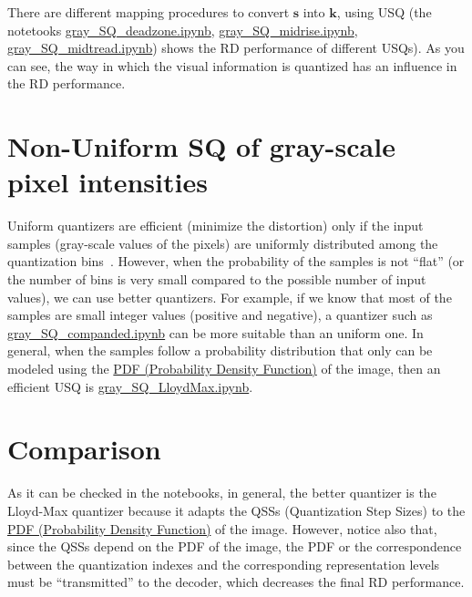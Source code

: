 There are different mapping procedures to convert $\mathbf{s}$ into
$\mathbf{k}$, using USQ (the notetooks
\href{https://github.com/Sistemas-Multimedia/Sistemas-Multimedia.github.io/blob/master/contents/gray_SQ/gray_SQ_deadzone.ipynb}{gray\_SQ\_deadzone.ipynb},
\href{https://github.com/Sistemas-Multimedia/Sistemas-Multimedia.github.io/blob/master/contents/gray_SQ/gray_SQ_midrise.ipynb}{gray\_SQ\_midrise.ipynb},
\href{https://github.com/Sistemas-Multimedia/Sistemas-Multimedia.github.io/blob/master/contents/gray_SQ/gray_SQ_midtread.ipynb}{gray\_SQ\_midtread.ipynb})
shows the RD performance of different USQs). As you can see, the way
in which the visual information is quantized has an influence in the
RD performance.

\section{Non-Uniform SQ of gray-scale pixel intensities}
Uniform quantizers are efficient (minimize the distortion) only if the
input samples (gray-scale values of the pixels) are uniformly
distributed among the quantization
bins~\cite{vruiz__scalar_quantization}. However, when the probability
of the samples is not ``flat'' (or the number of bins is very small
compared to the possible number of input values), we can use better
quantizers. For example, if we know that most of the samples are small
integer values (positive and negative), a quantizer such as
\href{https://github.com/Sistemas-Multimedia/Sistemas-Multimedia.github.io/blob/master/contents/gray_SQ/gray_SQ_companded.ipynb}{gray\_SQ\_companded.ipynb}
can be more suitable than an uniform one. In general, when the samples
follow a probability distribution that only can be modeled using the
\href{https://en.wikipedia.org/wiki/Probability_density_function}{PDF
  (Probability Density Function)} of the image, then an efficient USQ
is
\href{https://github.com/Sistemas-Multimedia/Sistemas-Multimedia.github.io/blob/master/contents/gray_SQ/gray_SQ_LloydMax.ipynb}{gray\_SQ\_LloydMax.ipynb}.

\section{Comparison}

As it can be checked in the notebooks, in general, the better
quantizer is the Lloyd-Max quantizer because it adapts the QSSs
(Quantization Step Sizes) to the
\href{https://en.wikipedia.org/wiki/Probability_density_function}{PDF
  (Probability Density Function)} of the image. However, notice also
that, since the QSSs depend on the PDF of the image, the PDF or the
correspondence between the quantization indexes and the corresponding
representation levels must be ``transmitted'' to the decoder, which
decreases the final RD performance.

